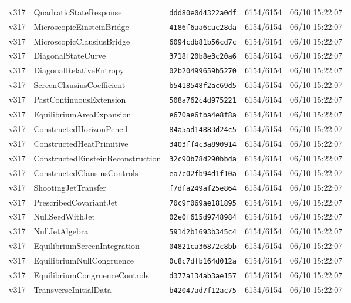 \documentclass[11pt]{article}
\theoremstyle{definition}\newtheorem{deriv}{Derivação}
\begin{document}
{\begin{longtable}{@{}lllll@{}}
v317 & QuadraticStateResponse & \texttt{ddd80e0d4322a0df} & 6154/6154 & 06/10 15:22:07 \\
v317 & MicroscopicEinsteinBridge & \texttt{4186f6aa6cac28da} & 6154/6154 & 06/10 15:22:07 \\
v317 & MicroscopicClausiusBridge & \texttt{6094cdb81b56cd7c} & 6154/6154 & 06/10 15:22:07 \\
v317 & DiagonalStateCurve & \texttt{3718f20b8e3c20a6} & 6154/6154 & 06/10 15:22:07 \\
v317 & DiagonalRelativeEntropy & \texttt{02b20499659b5270} & 6154/6154 & 06/10 15:22:07 \\
v317 & ScreenClausiusCoefficient & \texttt{b5418548f2ac69d5} & 6154/6154 & 06/10 15:22:07 \\
v317 & PastContinuousExtension & \texttt{508a762c4d975221} & 6154/6154 & 06/10 15:22:07 \\
v317 & EquilibriumAreaExpansion & \texttt{e670ae6fba4e8f8a} & 6154/6154 & 06/10 15:22:07 \\
v317 & ConstructedHorizonPencil & \texttt{84a5ad14883d24c5} & 6154/6154 & 06/10 15:22:07 \\
v317 & ConstructedHeatPrimitive & \texttt{3403ff4c3a890914} & 6154/6154 & 06/10 15:22:07 \\
v317 & ConstructedEinsteinReconstruction & \texttt{32c90b78d290bbda} & 6154/6154 & 06/10 15:22:07 \\
v317 & ConstructedClausiusControls & \texttt{ea7c02fb94d1f10a} & 6154/6154 & 06/10 15:22:07 \\
v317 & ShootingJetTransfer & \texttt{f7dfa249af25e864} & 6154/6154 & 06/10 15:22:07 \\
v317 & PrescribedCovariantJet & \texttt{70c9f069ae181895} & 6154/6154 & 06/10 15:22:07 \\
v317 & NullSeedWithJet & \texttt{02e0f615d9748984} & 6154/6154 & 06/10 15:22:07 \\
v317 & NullJetAlgebra & \texttt{591d2b1693b345c4} & 6154/6154 & 06/10 15:22:07 \\
v317 & EquilibriumScreenIntegration & \texttt{04821ca36872c8bb} & 6154/6154 & 06/10 15:22:07 \\
v317 & EquilibriumNullCongruence & \texttt{0c8c7dfb164d012a} & 6154/6154 & 06/10 15:22:07 \\
v317 & EquilibriumCongruenceControls & \texttt{d377a134ab3ae157} & 6154/6154 & 06/10 15:22:07 \\
v317 & TransverseInitialData & \texttt{b42047ad7f12ac75} & 6154/6154 & 06/10 15:22:07 \\

\end{longtable}}
\end{document}
